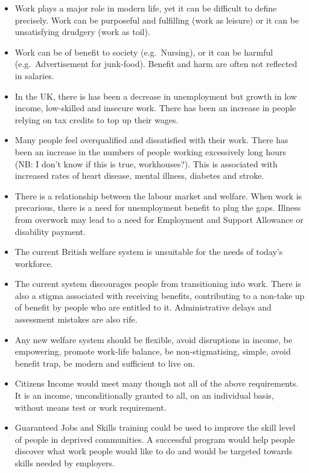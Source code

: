 \documentclass[]{tufte-handout}
\begin{document}
\begin{itemize}
\item
  Work plays a major role in modern life, yet it can be difficult to
  define precisely. Work can be purposeful and fulfilling (work as
  leisure) or it can be unsatisfying drudgery (work as toil).\\
\item
  Work can be of benefit to society (e.g.~Nursing), or it can be harmful
  (e.g.~Advertisement for junk-food). Benefit and harm are often not
  reflected in salaries.
\item
  In the UK, there is has been a decrease in unemployment but growth in
  low income, low-skilled and insecure work. There has been an increase
  in people relying on tax credits to top up their wages.
\item
  Many people feel overqualified and dissatisfied with their work. There
  has been an increase in the numbers of people working excessively long
  hours (NB: I don't know if this is true, workhouses?). This is
  associated with increased rates of heart disease, mental illness,
  diabetes and stroke.
\item
  There is a relationship between the labour market and welfare. When
  work is precarious, there is a need for unemployment benefit to plug
  the gaps. Illness from overwork may lead to a need for Employment and
  Support Allowance or disability payment.
\item
  The current British welfare system is unsuitable for the needs of
  today's workforce.
\item
  The current system discourages people from transitioning into work.
  There is also a stigma associated with receiving benefits,
  contributing to a non-take up of benefit by people who are entitled to
  it. Administrative delays and assessment mistakes are also rife.
\item
  Any new welfare system should be flexible, avoid disruptions in
  income, be empowering, promote work-life balance, be non-stigmatising,
  simple, avoid benefit trap, be modern and sufficient to live on.
\item
  Citizens Income would meet many though not all of the above
  requirements. It is an income, unconditionally granted to all, on an
  individual basis, without means test or work requirement.
\item
  Guaranteed Jobs and Skills training could be used to improve the skill
  level of people in deprived communities. A successful program would
  help people discover what work people would like to do and would be
  targeted towards skills needed by employers.
\end{itemize}
\end{document}
